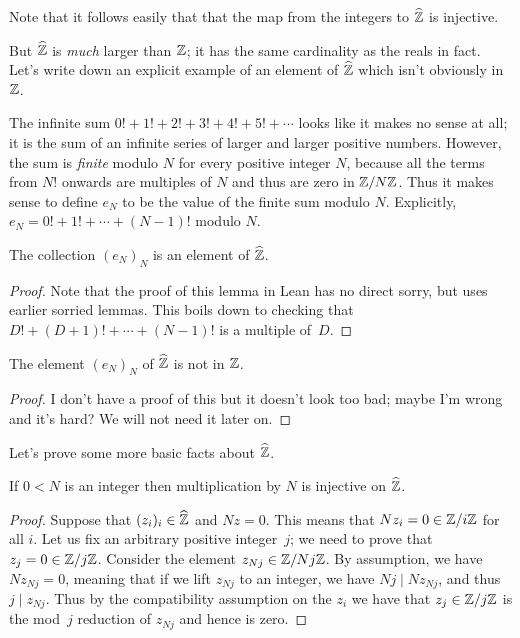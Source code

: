 Note that it follows easily that that the map from the integers to $\widehat{\mathbb{Z}}$ is injective.

But $\widehat{\mathbb{Z}}$
is \emph{much} larger than $\mathbb{Z}$; it has the same cardinality as the reals in fact. 
Let's write down an explicit example of an element of $\widehat{\mathbb{Z}}$ which isn't obviously in $\mathbb{Z}$.

\begin{definition}
    \label{ZHat.e}
    \leanok
    The infinite sum $0!+1!+2!+3!+4!+5!+\cdots$ looks 
    like it makes no sense at all; it is the sum of an infinite series of larger and larger
    positive numbers. 
    However, the sum is \emph{finite} modulo $N$ for every positive integer $N$, because 
    all the terms from $N!$ onwards are multiples of $N$ and thus are zero in $\mathbb{Z}/N\mathbb{Z}$.
    Thus it makes sense to define $e_N$ to be the value of the finite sum modulo $N$.
    Explicitly, $e_N=0!+1!+\cdots+(N-1)!$ modulo $N$.  
\end{definition}

\begin{lemma}
    \label{ZHat.e_def}
    \leanok
    The collection $(e_N)_N$ is an element of $\widehat{\mathbb{Z}}$.
\end{lemma}
\begin{proof}
    Note that the proof of this lemma in Lean has no direct sorry, but uses earlier sorried lemmas.
    This boils down to checking that $D!+(D+1)!+\cdots+(N-1)!$ is a multiple of~$D$.
\end{proof}

\begin{lemma}
    \label{ZHat.e_not_in_Int}
    \leanok
    The element $(e_N)_N$ of $\widehat{\mathbb{Z}}$ is not in $\mathbb{Z}$.
\end{lemma}
\begin{proof}\notready
    I don't have a proof of this but it doesn't look too bad; maybe I'm wrong
    and it's hard? We will not need it later on.
\end{proof}

Let's prove some more basic facts about $\widehat{\mathbb{Z}}$.

\begin{lemma}
    \label{ZHat.torsionfree}
    \leanok
    If $0<N$ is an integer then multiplication by $N$ is injective on $\widehat{\mathbb{Z}}$.
\end{lemma}
\begin{proof}
    \leanok
    Suppose that $(z_i)_i\in\widehat{\mathbb{Z}}$ and $Nz=0$. This means that $Nz_i=0\in\mathbb{Z}/i\mathbb{Z}$ for all $i$.
    Let us fix an arbitrary positive integer~$j$; we need to prove that $z_j=0\in\mathbb{Z}/j\mathbb{Z}$.
    Consider the element $z_{Nj}\in\mathbb{Z}/Nj\mathbb{Z}$. By assumption, we have $Nz_{Nj}=0$, meaning that
    if we lift $z_{Nj}$ to an integer, we have $Nj\mid Nz_{Nj}$, and thus $j\mid z_{Nj}$.
    Thus by the compatibility assumption on the $z_i$ we have that $z_j\in\mathbb{Z}/j\mathbb{Z}$ is the
    mod~$j$ reduction of $z_{Nj}$ and hence is zero.
\end{proof}


